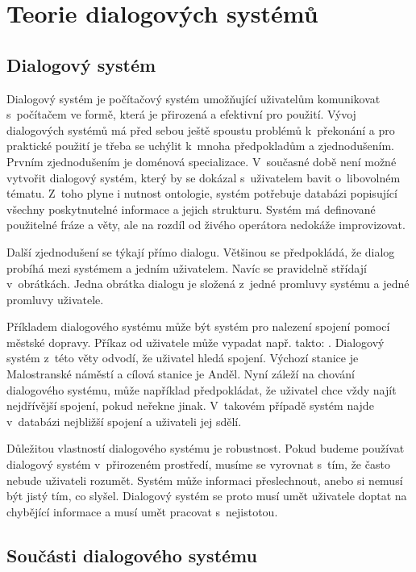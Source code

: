 \chapter{Teorie dialogových systémů}
\label{ch:kap1}

\section{Dialogový systém}

Dialogový systém je počítačový systém umožňující uživatelům komunikovat s~počítačem ve formě, která je přirozená a efektivní pro použití.
Vývoj dialogových systémů má před sebou ještě spoustu problémů k~překonání a pro praktické použití je třeba se uchýlit k~mnoha předpokladům a zjednodušením.
Prvním zjednodušením je doménová specializace.
V~současné době není možné vytvořit dialogový systém, který by se dokázal s~uživatelem bavit o~libovolném tématu.
Z~toho plyne i nutnost ontologie, systém potřebuje databázi popisující všechny poskytnutelné informace a jejich strukturu.
Systém má definované použitelné fráze a věty, ale na rozdíl od živého operátora nedokáže improvizovat.

Další zjednodušení se týkají přímo dialogu.
Většinou se předpokládá, že dialog probíhá mezi systémem a jedním uživatelem.
Navíc se pravidelně střídají v~obrátkách.
Jedna obrátka dialogu je složená z~jedné promluvy systému a jedné promluvy uživatele.

Příkladem dialogového systému může být systém pro nalezení spojení pomocí městské dopravy.
Příkaz od uživatele může vypadat např. takto: .
Dialogový systém z~této věty odvodí, že uživatel hledá spojení. 
Výchozí stanice je Malostranské náměstí a cílová stanice je Anděl.
Nyní záleží na chování dialogového systému, může například předpokládat, že uživatel chce vždy najít nejdřívější spojení, pokud neřekne jinak.
V~takovém případě systém najde v~databázi nejbližší spojení a uživateli jej sdělí.

Důležitou vlastností dialogového systému je robustnost.
Pokud budeme používat dialogový systém v~přirozeném prostředí, musíme se vyrovnat s~tím, že často nebude uživateli rozumět.
Systém může informaci přeslechnout, anebo si nemusí být jistý tím, co slyšel.
Dialogový systém se proto musí umět uživatele doptat na chybějící informace a musí umět pracovat s~nejistotou.

\section{Součásti dialogového systému}

